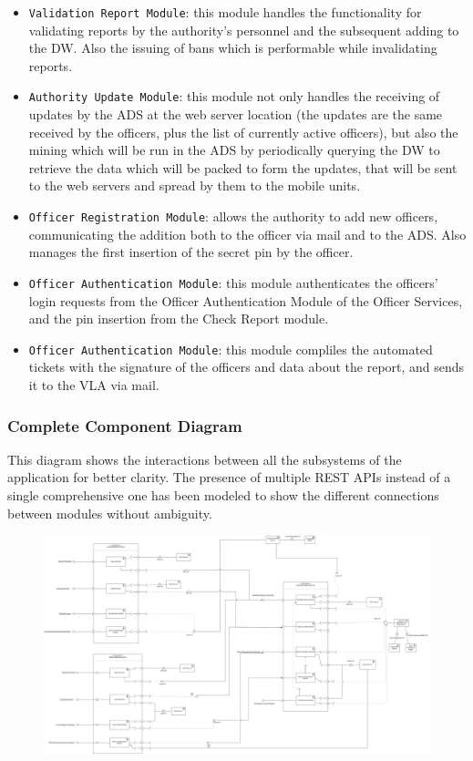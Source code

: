 \documentclass[12pt,a4paper]{article}
\begin{document}
\begin{itemize}
	\item \texttt{Validation Report Module}: this module handles the functionality for validating reports by the authority's personnel and the subsequent adding to the DW.  Also the issuing of bans which is performable while invalidating reports.
	\item \texttt{Authority Update Module}: this module not only handles the receiving of updates by the ADS at the web server location (the updates are the same received by the officers, plus the list of currently active officers), but also the mining which will be run in the ADS by periodically querying the DW to retrieve the data which will be packed to form the updates, that will be sent to the web servers and spread by them to the mobile units.
	\item \texttt{Officer Registration Module}: allows the authority to add new officers, communicating the addition both to the officer via mail and to the ADS. Also manages the first insertion of the secret pin by the officer.
	\item \texttt{Officer Authentication Module}: this module authenticates the officers' login requests from the Officer Authentication Module of the Officer Services, and the pin insertion from the Check Report module.
	\item \texttt{Officer Authentication Module}: this module compliles the automated tickets with the signature of the officers and data about the report, and sends it to the VLA via mail.
\end{itemize}
\newpage
\subsubsection{Complete Component Diagram}
This diagram shows the interactions between all the subsystems of the application for better clarity. The presence of multiple REST APIs instead of a single comprehensive one has been modeled to show the different connections between modules without ambiguity.
\begin{figure}[H]
				\centering
					\begin{adjustwidth}{-25mm}{-25mm}
					        \includegraphics[width=0.95\paperwidth]{Images/OverallComponent}
					\end{adjustwidth}
			\end{figure}
\newpage
\end{document}
